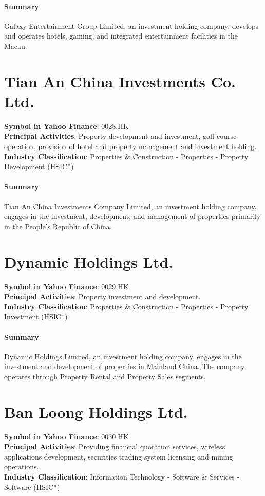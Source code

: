 \paragraph{Summary}
Galaxy Entertainment Group Limited, an investment holding company, develops and operates hotels, gaming, and integrated entertainment facilities in the Macau.


\section{Tian An China Investments Co. Ltd.}
\textbf{Symbol in Yahoo Finance}: 0028.HK\\
\textbf{Principal Activities}: Property development and investment, golf course operation, provision of hotel and property management and investment holding.\\
\textbf{Industry Classification}: Properties \& Construction - Properties - Property Development (HSIC*)
\paragraph{Summary}
Tian An China Investments Company Limited, an investment holding company, engages in the investment, development, and management of properties primarily in the People's Republic of China.


\section{Dynamic Holdings Ltd.}
\textbf{Symbol in Yahoo Finance}: 0029.HK\\
\textbf{Principal Activities}: Property investment and development.\\
\textbf{Industry Classification}: Properties \& Construction - Properties - Property Investment (HSIC*)
\paragraph{Summary}
Dynamic Holdings Limited, an investment holding company, engages in the investment and development of properties in Mainland China. The company operates through Property Rental and Property Sales segments.


\section{Ban Loong Holdings Ltd.}
\textbf{Symbol in Yahoo Finance}: 0030.HK\\
\textbf{Principal Activities}: Providing financial quotation services, wireless applications development, securities trading system licensing and mining operations.\\
\textbf{Industry Classification}: Information Technology - Software \& Services - Software (HSIC*)
